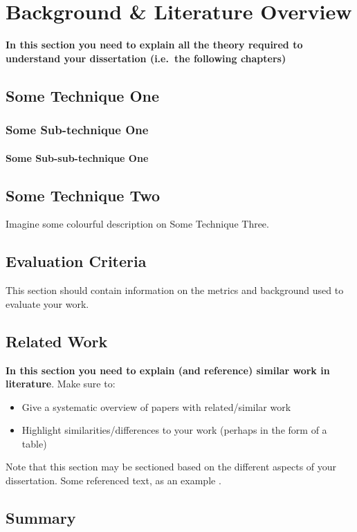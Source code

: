 \chapter{Background \& Literature Overview}
\textbf{In this section you need to explain all the theory required to understand your dissertation (i.e.\ the following chapters)}
\section{Some Technique One}
\blindtext
\subsection{Some Sub-technique One}
\blindtext
{}
\blindtext
\subsubsection{Some Sub-sub-technique One}
\blindtext
{}
\blindtext
{}

\section{Some Technique Two}
\blindtext[2]

Imagine some colourful description on Some Technique Three.

\blindtext[2]

\section{Evaluation Criteria}
This section should contain information on the metrics and background used to evaluate your work.
\section{Related Work}
\textbf{In this section you need to explain (and reference) similar work in literature}.  Make sure to:

\begin{itemize}
 \item Give a systematic overview of papers with related/similar work
 \item Highlight similarities/differences to your work (perhaps in the form of a table)
\end{itemize}

Note that this section may be sectioned based on the different aspects of your dissertation.  Some referenced text, as an example \citep{Arrighi2003, WithersMartinez2012, Ebejer2016}.

\section{Summary}

